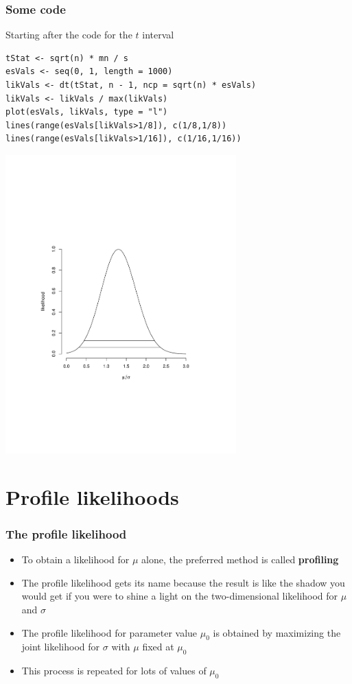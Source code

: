 \documentclass[aspectratio=169]{beamer}
\begin{document}
\begin{frame}[fragile]\frametitle{Some code}
Starting after the code for the $t$ interval
\begin{verbatim}
tStat <- sqrt(n) * mn / s
esVals <- seq(0, 1, length = 1000)
likVals <- dt(tStat, n - 1, ncp = sqrt(n) * esVals)
likVals <- likVals / max(likVals)
plot(esVals, likVals, type = "l")
lines(range(esVals[likVals>1/8]), c(1/8,1/8))
lines(range(esVals[likVals>1/16]), c(1/16,1/16))
\end{verbatim}
\end{frame}

\begin{frame}
\includegraphics[width=3.5in]{normalLikelihoodMean.pdf}
\end{frame}

\section{Profile likelihoods}
\begin{frame}\frametitle{The profile likelihood}
\begin{itemize}
\item To obtain a likelihood for $\mu$ alone, the preferred method is called {\bf profiling}
\item The profile likelihood gets its name because the result is like the shadow you would
  get if you were to shine a light on the two-dimensional likelihood for $\mu$ and $\sigma$
\item The profile likelihood for parameter value $\mu_0$ is obtained by maximizing the
  joint likelihood for $\sigma$ with $\mu$ fixed at $\mu_0$
\item This process is repeated for lots of values of $\mu_0$
\end{itemize}
\end{frame}
\end{document}
